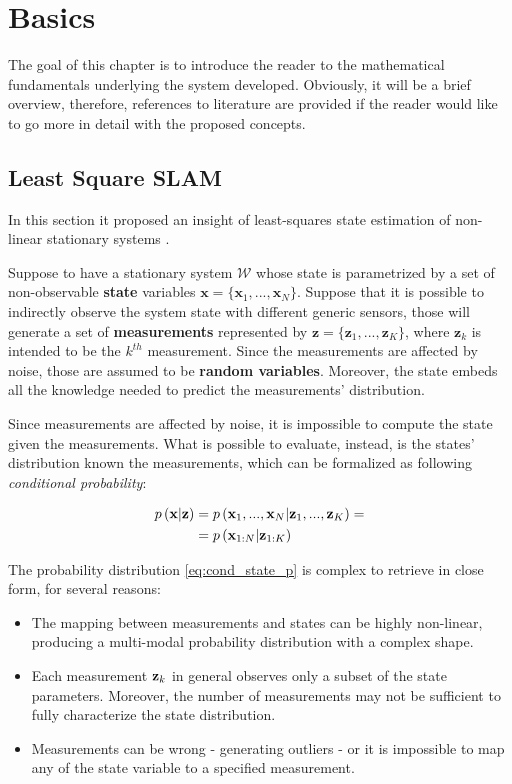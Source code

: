 \chapter{Basics}\label{ch:basics}
The goal of this chapter is to introduce the reader to the mathematical fundamentals underlying the system developed. Obviously, it will be a brief overview, therefore, references to literature are provided if the reader would like to go more in detail with the proposed concepts.

\section{Least Square SLAM}\label{sec:ls_formulation}
In this section it proposed an insight of least-squares state estimation of non-linear stationary systems \cite{charnes1976least-squares}.

Suppose to have a stationary system $\mathcal{W}$ whose state is parametrized by a set of non-observable \textbf{state} variables $\mathbf{x} = \{\mathbf{x}_1, ..., \mathbf{x}_N\}$. Suppose that it is possible to indirectly observe the system state with different generic sensors, those will generate a set of \textbf{measurements} represented by $\mathbf{z} = \{\mathbf{z}_1, ..., \mathbf{z}_K\}$, where $\mathbf{z}_k$ is intended to be the $k^{th}$ measurement. Since the measurements are affected by noise, those are assumed to be \textbf{random variables}. Moreover, the state embeds all the knowledge needed to predict the measurements' distribution.

Since measurements are affected by noise, it is impossible to compute the state given the measurements. What is possible to evaluate, instead, is the states' distribution known the measurements, which can be formalized as following \textit{conditional probability}:

\begin{align} 
    p\left(\mathbf{x} | \mathbf{z}\right) &= p\left(\mathbf{x}_1, ..., \mathbf{x}_N | \mathbf{z}_1, ..., \mathbf{z}_K\right) = \nonumber \\
    &= p\left(\mathbf{x}_{1:N} | \mathbf{z}_{1:K}\right)
    \label{eq:cond_state_p}
\end{align}

The probability distribution \ref{eq:cond_state_p} is complex to retrieve in close form, for several reasons: 
\begin{itemize}
    \item The mapping between measurements and states can be highly non-linear, producing a multi-modal probability distribution with a complex shape.
    \item Each measurement $\mathbf{z}_k$ in general observes only a subset of the state parameters. Moreover, the number of measurements may not be sufficient to fully characterize the state distribution.
    \item Measurements can be wrong - generating outliers - or it is impossible to map any of the state variable to a specified measurement.
\end{itemize}


